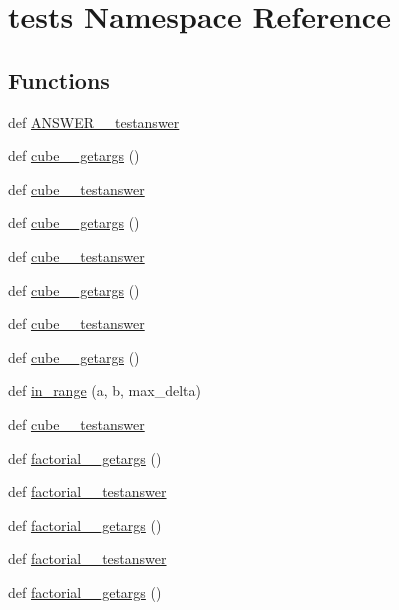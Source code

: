 \hypertarget{namespacetests}{}\section{tests Namespace Reference}
\label{namespacetests}
\subsection*{Functions}
\begin{DoxyCompactItemize}
\item 
def \hyperlink{namespacetests_a798a3219a53b8c911bbeaadad7ef68b6}{A\+N\+S\+W\+E\+R\+\_\+\_\+testanswer}
\item 
def \hyperlink{namespacetests_a84fc4ea039f319849520c69afb630a90}{cube\+\_\+\_\+getargs} ()
\item 
def \hyperlink{namespacetests_ad1ab9e5bac1751576741fcc64150a71c}{cube\+\_\+\_\+testanswer}
\item 
def \hyperlink{namespacetests_a18c3cd95089c07ad5ab1d75c626c4222}{cube\+\_\+\_\+getargs} ()
\item 
def \hyperlink{namespacetests_a29c8c792542576662c401bb1ef8b3d5f}{cube\+\_\+\_\+testanswer}
\item 
def \hyperlink{namespacetests_aef0f3ccc714875d90a24485dfd648269}{cube\+\_\+\_\+getargs} ()
\item 
def \hyperlink{namespacetests_aecef194fb670ddcd802f6ed5c2c955e5}{cube\+\_\+\_\+testanswer}
\item 
def \hyperlink{namespacetests_a43f2823a45922a1ec48ef36848966667}{cube\+\_\+\_\+getargs} ()
\item 
def \hyperlink{namespacetests_adb3d184aee2670467e490d649059c8bb}{in\+\_\+range} (a, b, max\+\_\+delta)
\item 
def \hyperlink{namespacetests_a1a18203ae9ca13b875955376926a335b}{cube\+\_\+\_\+testanswer}
\item 
def \hyperlink{namespacetests_a7b79bf6275db75c7ca9dd97b98c67e24}{factorial\+\_\+\_\+getargs} ()
\item 
def \hyperlink{namespacetests_a54aee3a9c00ef23b8502e367a235485b}{factorial\+\_\+\_\+testanswer}
\item 
def \hyperlink{namespacetests_a73a6b17b2d76be6297700e2293dc26b5}{factorial\+\_\+\_\+getargs} ()
\item 
def \hyperlink{namespacetests_a79527cf1319271db509d6e0f252cfb0c}{factorial\+\_\+\_\+testanswer}
\item 
def \hyperlink{namespacetests_a3bb159621df76586ee89f34bee9f46c3}{factorial\+\_\+\_\+getargs} ()

\end{DoxyCompactItemize}

